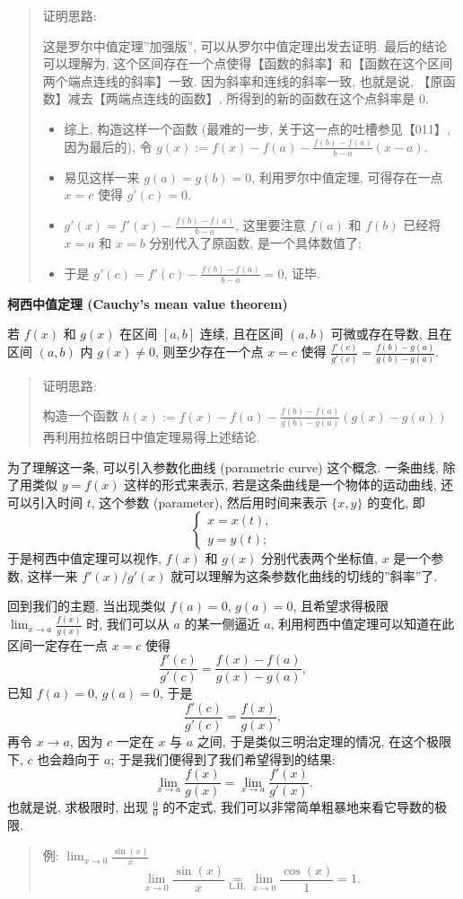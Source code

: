 \begin{quote}
证明思路:

这是罗尔中值定理''加强版'', 可以从罗尔中值定理出发去证明.
最后的结论可以理解为,
这个区间存在一个点使得【函数的斜率】和【函数在这个区间两个端点连线的斜率】一致.
因为斜率和连线的斜率一致, 也就是说, 【原函数】减去【两端点连线的函数】,
所得到的新的函数在这个点斜率是 \(0\).

\begin{itemize}
\tightlist
\item
  综上, 构造这样一个函数 (最难的一步, 关于这一点的吐槽参见【011】,
  因为最后的), 令 \(g(x):=f(x)-f(a)-\frac{f(b)-f(a)}{b-a}(x-a)\).
\item
  易见这样一来 \(g(a)=g(b)=0\), 利用罗尔中值定理, 可得存在一点 \(x=c\)
  使得 \(g'(c)=0\).
\item
  \(g'(x)=f'(x)-\frac{f(b)-f(a)}{b-a}\), 这里要注意 \(f(a)\) 和 \(f(b)\)
  已经将 \(x=a\) 和 \(x=b\) 分别代入了原函数, 是一个具体数值了;
\item
  于是 \(g'(c)=f'(c)-\frac{f(b)-f(a)}{b-a}=0\), 证毕.
\end{itemize}
\end{quote}

\textbf{柯西中值定理 (Cauchy's mean value theorem)}

若 \(f(x)\) 和 \(g(x)\) 在区间 \([a,b]\) 连续, 且在区间 \((a,b)\)
可微或存在导数, 且在区间 \((a,b)\) 内 \(g(x)\neq0\), 则至少存在一个点
\(x=c\) 使得 \(\frac{f'(c)}{g'(c)}=\frac{f(b)-g(a)}{g(b)-g(a)}\).

\begin{quote}
证明思路:

构造一个函数 \(h(x):=f(x)-f(a)-\frac{f(b)-f(a)}{g(b)-g(a)}(g(x)-g(a))\)
再利用拉格朗日中值定理易得上述结论.
\end{quote}

为了理解这一条, 可以引入参数化曲线 (parametric curve) 这个概念.
一条曲线, 除了用类似 \(y=f(x)\) 这样的形式来表示,
若是这条曲线是一个物体的运动曲线, 还可以引入时间 \(t\), 这个参数
(parameter), 然后用时间来表示 \(\{x,y\}\) 的变化, 即 \[
\begin{cases}
x=x(t),\\
y=y(t);
\end{cases}
\] 于是柯西中值定理可以视作, \(f(x)\) 和 \(g(x)\) 分别代表两个坐标值,
\(x\) 是一个参数, 这样一来 \(f'(x)/g'(x)\)
就可以理解为这条参数化曲线的切线的''斜率''了.

回到我们的主题, 当出现类似 \(f(a)=0\), \(g(a)=0\), 且希望求得极限
\(\lim_{x\rightarrow a}\frac{f(x)}{g(x)}\) 时, 我们可以从 \(a\)
的某一侧逼近 \(a\), 利用柯西中值定理可以知道在此区间一定存在一点 \(x=c\)
使得 \[
\frac{f'(c)}{g'(c)}=\frac{f(x)-f(a)}{g(x)-g(a)},
\] 已知 \(f(a)=0\), \(g(a)=0\), 于是 \[
\frac{f'(c)}{g'(c)}=\frac{f(x)}{g(x)},
\] 再令 \(x\rightarrow a\), 因为 \(c\) 一定在 \(x\) 与 \(a\) 之间,
于是类似三明治定理的情况, 在这个极限下, \(c\) 也会趋向于 \(a\);
于是我们便得到了我们希望得到的结果: \[
\boxed{\lim_{x\rightarrow a}\frac{f(x)}{g(x)}=\lim_{x\rightarrow a}\frac{f'(x)}{g'(x)}}.
\] 也就是说, 求极限时, 出现 \(\frac{0}{0}\) 的不定式,
我们可以非常简单粗暴地来看它导数的极限.

\begin{quote}
例: \(\lim_{x\rightarrow 0}\frac{\sin(x)}{x}\) \[
\lim_{x\rightarrow 0}\frac{\sin(x)}{x}\underset{\text{L.H.}}{=}\lim_{x\rightarrow 0}\frac{\cos(x)}{1}=1.
\]
\end{quote}
